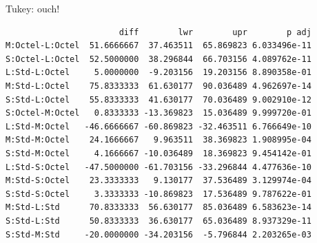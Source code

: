 \documentclass[
  ignorenonframetext,
]{beamer}
\newenvironment{Shaded}{\begin{snugshade}}{\end{snugshade}}
\newcommand{\AttributeTok}[1]{\textcolor[rgb]{0.40,0.45,0.13}{#1}}
\newcommand{\FloatTok}[1]{\textcolor[rgb]{0.68,0.00,0.00}{#1}}
\newcommand{\FunctionTok}[1]{\textcolor[rgb]{0.28,0.35,0.67}{#1}}
\newcommand{\NormalTok}[1]{\textcolor[rgb]{0.00,0.23,0.31}{#1}}
\newcommand{\OtherTok}[1]{\textcolor[rgb]{0.00,0.23,0.31}{#1}}
\newcommand{\SpecialCharTok}[1]{\textcolor[rgb]{0.37,0.37,0.37}{#1}}
\newcommand{\StringTok}[1]{\textcolor[rgb]{0.13,0.47,0.30}{#1}}
\begin{document}
\begin{frame}[fragile]{Tukey: ouch!}
\protect\hypertarget{tukey-ouch}{}
\scriptsize

\begin{Shaded}
\end{Shaded}

\begin{verbatim}
                       diff        lwr        upr        p adj
M:Octel-L:Octel  51.6666667  37.463511  65.869823 6.033496e-11
S:Octel-L:Octel  52.5000000  38.296844  66.703156 4.089762e-11
L:Std-L:Octel     5.0000000  -9.203156  19.203156 8.890358e-01
M:Std-L:Octel    75.8333333  61.630177  90.036489 4.962697e-14
S:Std-L:Octel    55.8333333  41.630177  70.036489 9.002910e-12
S:Octel-M:Octel   0.8333333 -13.369823  15.036489 9.999720e-01
L:Std-M:Octel   -46.6666667 -60.869823 -32.463511 6.766649e-10
M:Std-M:Octel    24.1666667   9.963511  38.369823 1.908995e-04
S:Std-M:Octel     4.1666667 -10.036489  18.369823 9.454142e-01
L:Std-S:Octel   -47.5000000 -61.703156 -33.296844 4.477636e-10
M:Std-S:Octel    23.3333333   9.130177  37.536489 3.129974e-04
S:Std-S:Octel     3.3333333 -10.869823  17.536489 9.787622e-01
M:Std-L:Std      70.8333333  56.630177  85.036489 6.583623e-14
S:Std-L:Std      50.8333333  36.630177  65.036489 8.937329e-11
S:Std-M:Std     -20.0000000 -34.203156  -5.796844 2.203265e-03
\end{verbatim}

\normalsize
\end{frame}
\end{document}
